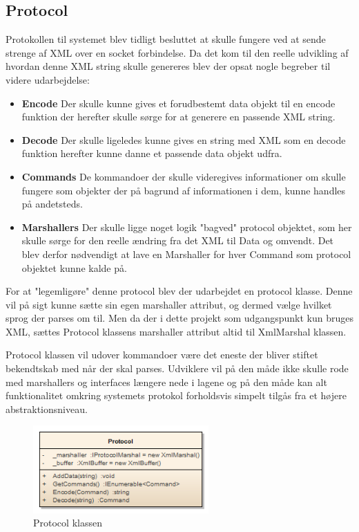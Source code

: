 \subsection{Protocol}\label{PROTOKOL}
Protokollen til systemet blev tidligt besluttet at skulle fungere ved at sende strenge af XML over en socket forbindelse. Da det kom til den reelle udvikling af hvordan denne XML string skulle genereres blev der opsat nogle begreber til videre udarbejdelse:

\begin{itemize}
\item \textbf{Encode} Der skulle kunne gives et forudbestemt data objekt til en encode funktion der herefter skulle sørge for at generere en passende XML string. 
\item \textbf{Decode} Der skulle ligeledes kunne gives en string med XML som en decode funktion herefter kunne danne et passende data objekt udfra. 
\item \textbf{Commands} De kommandoer der skulle videregives informationer om skulle fungere som objekter der på bagrund af informationen i dem, kunne handles på andetsteds.
\item \textbf{Marshallers} Der skulle ligge noget logik "bagved" protocol objektet, som her skulle sørge for den reelle ændring fra det XML til Data og omvendt. Det blev derfor nødvendigt at lave en Marshaller for hver Command som protocol objektet kunne kalde på.
\end{itemize}

For at "legemligøre" denne protocol blev der udarbejdet en protocol klasse. Denne vil på sigt kunne sætte sin egen marshaller attribut, og dermed vælge hvilket sprog der parses om til. Men da der i dette projekt som udgangspunkt kun bruges XML, sættes Protocol klassens marshaller attribut altid til XmlMarshal klassen.

Protocol klassen vil udover kommandoer være det eneste der bliver stiftet bekendtskab med når der skal parses. Udviklere vil på den måde ikke skulle rode med marshallers og interfaces længere nede i lagene og på den måde kan alt funktionalitet omkring systemets protokol forholdsvis simpelt tilgås fra et højere abstraktionsniveau.

\begin{figure}[H]
	\centering
	\includegraphics[width=0.6\textwidth]{Systemdesign/SharedLib/Images/Klasser/Protocol.png}
	\caption{Protocol klassen}
	\label{fig:klasseProtocol}
\end{figure}


